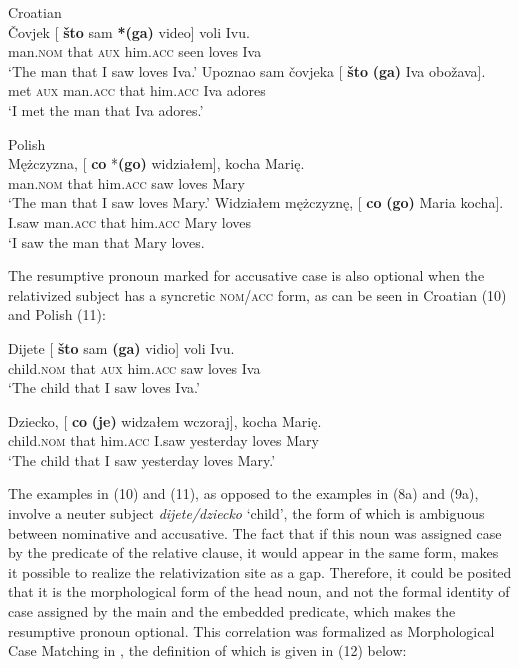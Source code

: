 \documentclass[output=paper]{langsci/langscibook}
\begin{document}
\ea%
    Croatian\label{ex:leska:8}\\
    \ea
    \gll Čovjek   [  \textbf{što}   sam \textbf{*(ga)}   video]   voli   Ivu.\\
          man.\textsc{nom}  {} that \textsc{aux}   him.\textsc{acc}   seen   loves   Iva\\
    \glt ‘The man that I saw loves Iva.’
    \ex
    \gll Upoznao   sam čovjeka [  \textbf{što} \textbf{(ga)}   Iva obožava].\\
         met   \textsc{aux} man.\textsc{acc} {}  that him.\textsc{acc} Iva adores\\
    \glt ‘I met the man that Iva adores.’
    \z
\z    

\ea%
    Polish\label{ex:leska:9}\\
    \ea
    \gll Mężczyzna, [ \textbf{co} *\textbf{(go)}   widziałem],   kocha   Marię.\\
         man.\textsc{nom} {}  that him.\textsc{acc}   saw     loves   Mary\\
    \glt ‘The man that I saw loves Mary.’
    \ex
    \gll Widziałem   mężczyznę, [  \textbf{co} \textbf{(go)}   Maria   kocha]. \\
          I.saw     man.\textsc{acc} {}  that him.\textsc{acc}   Mary   loves\\
    \glt ‘I saw the man that Mary loves.
    \z
\z
          
The resumptive pronoun marked for accusative case is also optional when the relativized subject has a syncretic \textsc{nom\slash acc} form, as can be seen in Croatian (10) and Polish (11): 

\ea%
    \label{ex:leska:10}
    \gll Dijete   [ \textbf{što} sam \textbf{(ga)}   vidio]   voli   Ivu.\\
         child.\textsc{nom} {}  that \textsc{aux} him.\textsc{acc}   saw   loves   Iva\\
    \glt ‘The child that I saw loves Iva.’
    \z

\ea%
    \label{ex:leska:11}
    \gll Dziecko, [ \textbf{co} \textbf{(je)}   widzałem   wczoraj],   kocha   Marię.\\
         child.\textsc{nom} {} that him.\textsc{acc}  I.saw   yesterday   loves   Mary\\
    \glt ‘The child that I saw yesterday loves Mary.’
    \z

The examples in (10) and (11), as opposed to the examples in (8a) and (9a), involve a neuter subject \textit{dijete\slash dziecko} ‘child’, the form of which is ambiguous between nominative and accusative. The fact that if this noun was assigned case by the predicate of the relative clause, it would appear in the same form, makes it possible to realize the relativization site as a gap. Therefore, it could be posited that it is the morphological form of the head noun, and not the formal identity of case assigned by the main and the embedded predicate, which makes the resumptive pronoun optional. This correlation was formalized as Morphological Case Matching in \citet[30]{Gračanin-Yuksek2013}, the definition of which is given in (12) below: 
\end{document}
